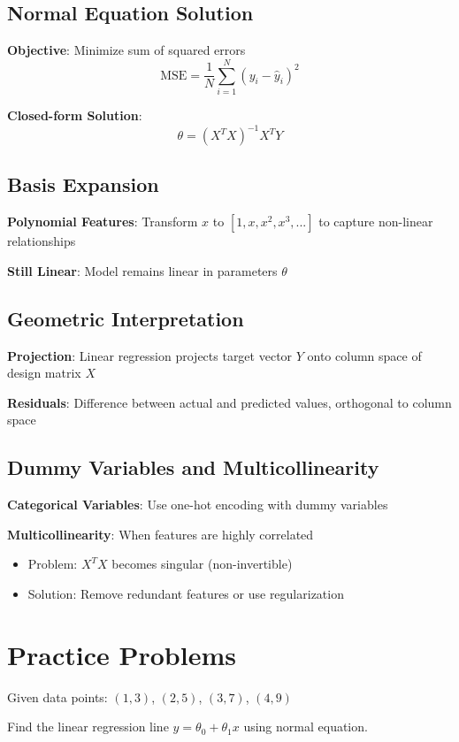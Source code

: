 \documentclass{article}
\newcounter{exercise}
\begin{document}
\subsection{Normal Equation Solution}

\textbf{Objective}: Minimize sum of squared errors
$$\text{MSE} = \frac{1}{N} \sum_{i=1}^N (y_i - \hat{y}_i)^2$$

\textbf{Closed-form Solution}:
$$\theta = (X^T X)^{-1} X^T Y$$

\subsection{Basis Expansion}

\textbf{Polynomial Features}: Transform $x$ to $[1, x, x^2, x^3, ...]$ to capture non-linear relationships

\textbf{Still Linear}: Model remains linear in parameters $\theta$

\subsection{Geometric Interpretation}

\textbf{Projection}: Linear regression projects target vector $Y$ onto column space of design matrix $X$

\textbf{Residuals}: Difference between actual and predicted values, orthogonal to column space

\subsection{Dummy Variables and Multicollinearity}

\textbf{Categorical Variables}: Use one-hot encoding with dummy variables

\textbf{Multicollinearity}: When features are highly correlated
\begin{itemize}
    \item Problem: $X^T X$ becomes singular (non-invertible)
    \item Solution: Remove redundant features or use regularization
\end{itemize}

\section{Practice Problems}

\begin{tcolorbox}[colback=gray!5!white,colframe=gray!75!black,title=Problem \stepcounter{exercise}: Basic Linear Regression]

Given data points: $(1,3)$, $(2,5)$, $(3,7)$, $(4,9)$

Find the linear regression line $y = \theta_0 + \theta_1 x$ using normal equation.
\end{tcolorbox}
\end{document}

